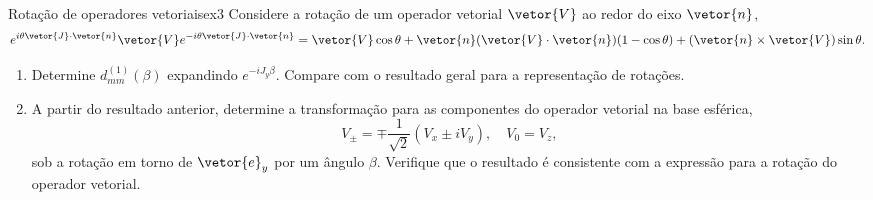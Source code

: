 \begin{exercício}{Rotação de operadores vetoriais}{ex3}
    Considere a rotação de um operador vetorial \(\vetor{V}\) ao redor do eixo \(\vetor{n}\),
    \begin{equation*}
        e^{i\theta \vetor{J}\cdot \vetor{n}} \vetor{V} e^{-i \theta \vetor{J} \cdot \vetor{n}} = \vetor{V} \cos\theta + \vetor{n} (\vetor{V}\cdot \vetor{n}) (1 - \cos\theta) + (\vetor{n}\times \vetor{V}) \sin\theta.
    \end{equation*}
    \begin{enumerate}[label=(\alph*)]
        \item Determine \(d_{mm}^{(1)}(\beta)\) expandindo \(e^{-iJ_y \beta}\). Compare com o resultado geral para a representação de rotações.
        \item A partir do resultado anterior, determine a transformação para as componentes do operador vetorial na base esférica,
            \begin{equation*}
                V_\pm = \mp \frac{1}{\sqrt{2}} \left(V_x \pm i V_y\right),\quad
                V_0 = V_z,
            \end{equation*}
            sob a rotação em torno de \(\vetor{e}_y\) por um ângulo \(\beta.\) Verifique que o resultado é consistente com a expressão para a rotação do operador vetorial.
    \end{enumerate}
\end{exercício}
